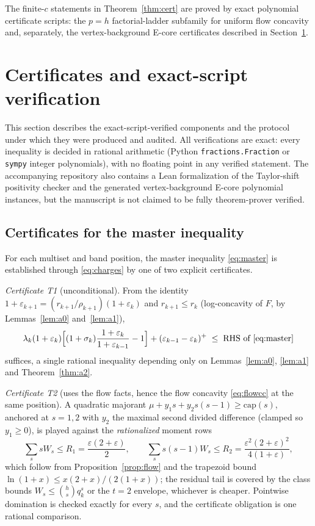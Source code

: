 \documentclass[11pt]{article}
\theoremstyle{definition}
\newcommand{\eps}{\varepsilon}
\begin{document}
The finite-$c$ statements in Theorem~\ref{thm:cert} are proved by
exact polynomial certificate scripts: the $p=h$ factorial-ladder
subfamily for uniform flow concavity and, separately, the
vertex-background E-core certificates described in
Section~\ref{sec:verification}.

\section{Certificates and exact-script verification}\label{sec:verification}

This section describes the exact-script-verified components and the
protocol under which they were produced and audited.  All
verifications are exact: every inequality is decided in rational
arithmetic (Python \texttt{fractions.Fraction} or \texttt{sympy}
integer polynomials), with no floating point in any verified
statement.  The accompanying repository also contains a Lean
formalization of the Taylor-shift positivity checker and the generated
vertex-background E-core polynomial instances, but the manuscript is not
claimed to be fully theorem-prover verified.

\subsection{Certificates for the master inequality}

For each multiset and band position, the master inequality
\eqref{eq:master} is established through \eqref{eq:charges} by one of
two explicit certificates.

\emph{Certificate T1} (unconditional).  From the identity
$1+\eps_{k+1}=(r_{k+1}/\rho_{k+1})(1+\eps_k)$ and $r_{k+1}\le r_k$
(log-concavity of $F$, by Lemmas~\ref{lem:a0} and~\ref{lem:a1}),
\[
  \lambda_k(1+\eps_k)\Bigl[(1+\sigma_k)\frac{1+\eps_k}{1+\eps_{k-1}}-1\Bigr]
  +(\eps_{k-1}-\eps_k)^+\;\le\;\text{RHS of \eqref{eq:master}}
\]
suffices, a single rational inequality depending only on
Lemmas~\ref{lem:a0}, \ref{lem:a1} and Theorem~\ref{thm:a2}.

\emph{Certificate T2} (uses the flow facts, hence the flow
concavity \eqref{eq:flowcc} at the same position).  A quadratic
majorant
$\mu+y_1s+y_2s(s-1)\ge\mathrm{cap}(s)$, anchored at $s=1,2$ with $y_2$
the maximal second divided difference (clamped so $y_1\ge0$), is
played against the \emph{rationalized} moment rows
\[
  \sum_ssW_s\le R_1=\frac{\eps(2+\eps)}{2},\qquad
  \sum_ss(s-1)W_s\le R_2=\frac{\eps^2(2+\eps)^2}{4(1+\eps)},
\]
which follow from Proposition~\ref{prop:flow} and the trapezoid bound
$\ln(1+x)\le x(2+x)/(2(1+x))$; the residual tail is covered by the
class bounds $W_s\le\binom hsq_k^s$ or the $t=2$ envelope, whichever
is cheaper.  Pointwise domination is checked exactly for every $s$,
and the certificate obligation is one rational comparison.
\end{document}
